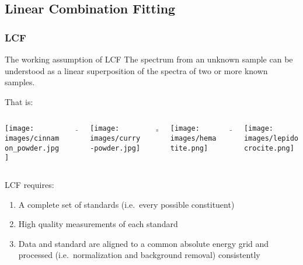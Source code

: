 \documentclass[10pt, xcolor=x11names, compress]{beamer}
\begin{document}
\subsection[LCF]{Linear Combination Fitting}

\begin{frame}
  \frametitle{LCF}

  \begin{block}{The working assumption of LCF}
    The spectrum from an unknown sample can be understood as a linear
    superposition of the spectra of two or more known samples.
  \end{block}

  That is:

  \begin{columns}
    \begin{column}{0.2\linewidth}
      \texttt{[image: images/cinnamon\_powder.jpg]}
    \end{column}
    \begin{column}{0.03\linewidth}
      +
    \end{column}
    \begin{column}{0.2\linewidth}
      \texttt{[image: images/curry-powder.jpg]} 
    \end{column}
    \begin{column}{0.03\linewidth}
      =
    \end{column}
    \begin{column}{0.2\linewidth}
      \texttt{[image: images/hematite.png]} 
    \end{column}
    \begin{column}{0.03\linewidth}
      +
    \end{column}
    \begin{column}{0.2\linewidth}
      \texttt{[image: images/lepidocrocite.png]}
    \end{column}
  \end{columns}

  \bigskip

  LCF requires:
  \begin{enumerate}
  \item A complete set of standards (i.e.\ every possible constituent)
  \item High quality measurements of each standard
  \item Data and standard are aligned to a common absolute energy grid
    and processed (i.e.\ normalization and background removal)
    consistently
  \end{enumerate}
\end{frame}
\end{document}
